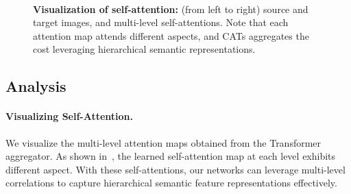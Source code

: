 \begin{figure*}[t]
\centering
\renewcommand{\thesubfigure}{}
\hfill
{}\hfill
{}\hfill
{}\hfill
{}\hfill
{}\hfill\\
\vspace{-10pt}
\caption{\textbf{Visualization of self-attention:} (from left to right) source and target images, and multi-level self-attentions. Note that each attention map attends different aspects, and CATs aggregates the cost leveraging hierarchical semantic representations. }
\label{fig:attention}\vspace{-10pt}
\end{figure*} 

\subsection{Analysis}
\paragraph{Visualizing Self-Attention.}
We visualize the multi-level attention maps obtained from the Transformer aggregator. 
As shown in~, the learned self-attention map at each level exhibits different aspect. With these self-attentions, our networks can leverage multi-level correlations to capture hierarchical semantic feature representations effectively. 
\vspace{-5pt}

